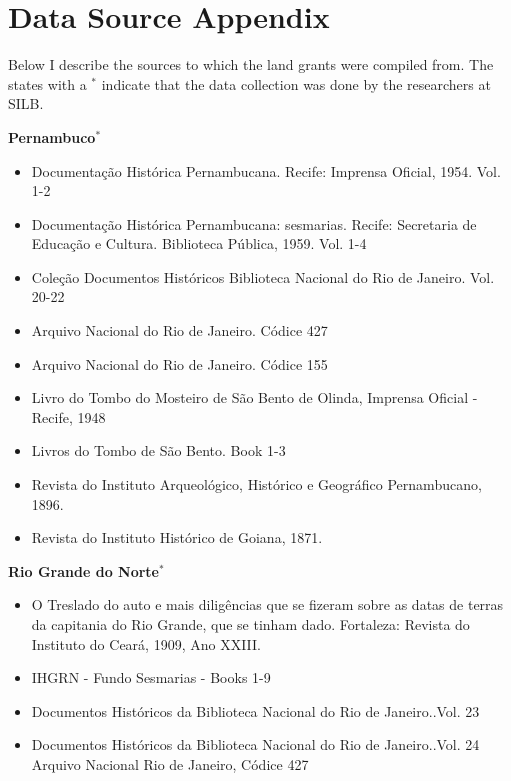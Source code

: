 \documentclass[11pt]{article}
\begin{document}


\begin{comment}
\subsection{1991 Census}
\end{comment}


\section{Data Source Appendix}
\label{app:data_source_appendix}

Below I describe the sources to which the land grants were compiled from. The states with a $^*$ indicate that the data collection was done by the researchers at SILB.

\vspace{2mm}

\textbf{Pernambuco$^*$}
\begin{itemize}
\item Documentação Histórica Pernambucana. Recife: Imprensa Oficial, 1954. Vol. 1-2
\item Documentação Histórica Pernambucana: sesmarias. Recife: Secretaria de Educação e Cultura. Biblioteca Pública, 1959. Vol. 1-4
\item Coleção Documentos Históricos Biblioteca Nacional do Rio de Janeiro. Vol. 20-22
\item Arquivo Nacional do Rio de Janeiro. Códice 427
\item Arquivo Nacional do Rio de Janeiro. Códice 155
\item Livro do Tombo do Mosteiro de São Bento de Olinda, Imprensa Oficial - Recife, 1948
\item Livros do Tombo de São Bento. Book 1-3
\item Revista do Instituto Arqueológico, Histórico e Geográfico Pernambucano, 1896.
\item Revista do Instituto Histórico de Goiana, 1871.
\end{itemize}

\textbf{Rio Grande do Norte$^*$}
\begin{itemize}
  \item O Treslado do auto e mais diligências que se fizeram sobre as datas de terras da capitania do Rio Grande, que se tinham dado. Fortaleza: Revista do Instituto do Ceará, 1909, Ano XXIII.
  \item IHGRN - Fundo Sesmarias - Books 1-9
  \item Documentos Históricos da Biblioteca Nacional do Rio de Janeiro..Vol. 23
  \item Documentos Históricos da Biblioteca Nacional do Rio de Janeiro..Vol. 24 Arquivo Nacional Rio de Janeiro, Códice 427
\end{itemize}
\end{document}
